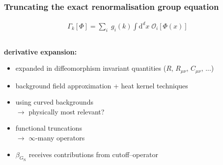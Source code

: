 \documentclass[]{beamer}  %
\newcommand\GNewton{ G_{\scriptscriptstyle{\mathrm{N}}}{} }
\begin{document}
\addtocounter{framenumber}{-1}
\begin{frame}
  \frametitle{Truncating the exact renormalisation group equation}

  \begin{align*}
    \boxed{
      \Gamma_k[\Phi] = \sum_i \; g_i(k) \! \int \mathrm d^d x \; \mathcal O_i [\Phi(x)]
    }
  \end{align*}

  \vspace{-15pt}
  \begin{columns}[T]

    \begin{column}{.5\textwidth}
      \begin{center}
        \textbf{derivative expansion:}
        \begin{itemize}
          \item
            expanded in diffeomorphism invariant quantities
            ($R$, $R_{\mu\nu}$, $C_{\mu\nu}$, ...)\\[8pt]
          \item
            background field approximation + heat kernel
            techniques\\[8pt]
          \item
            using curved backgrounds\\
            $\rightarrow$ physically most relevant?\\[8pt]
          \item
            functional truncations\\
            $\rightarrow$ $\infty$-many operators\\[8pt]
          \item
            $\beta_{\GNewton}$ receives contributions
            from cutoff--operator\\[8pt]
        \end{itemize}
      \end{center}
    \end{column}


\end{columns}
\end{frame}
\end{document}
